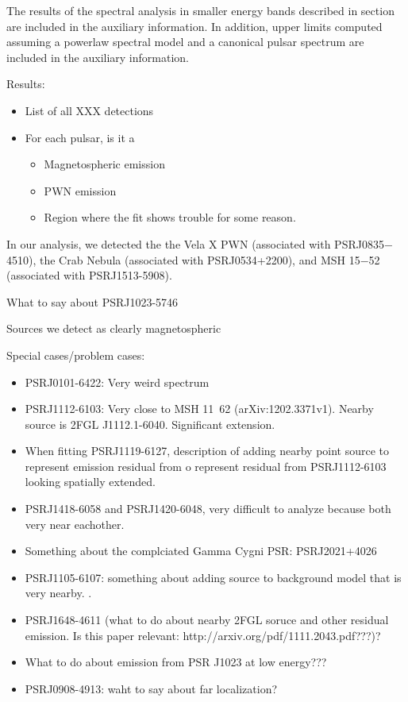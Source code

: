 The results of the spectral analysis in smaller energy bands described
in section  are included in the auxiliary
information. In addition, upper limits computed assuming a powerlaw
spectral model and a canonical pulsar spectrum are included in the
auxiliary information.



Results:
\begin{itemize}
  \item List of all XXX detections
  \item For each pulsar, is it a 
    \begin{itemize}
      \item Magnetospheric emission
      \item PWN emission
      \item Region where the fit shows trouble for some reason.
    \end{itemize}
\end{itemize}

In our analysis, we detected the the Vela X PWN (associated with PSRJ0835$-$4510), the Crab Nebula (associated
with PSRJ0534+2200), and MSH 15$-$52 (associated with PSRJ1513-5908).

What to say about PSRJ1023-5746

Sources we detect as clearly magnetospheric

Special cases/problem cases:
\begin{itemize}
  \item PSRJ0101-6422: Very weird spectrum
  \item PSRJ1112-6103: Very close to MSH 11~62 (arXiv:1202.3371v1). Nearby source is 2FGL J1112.1-6040. Significant extension.
  \item When fitting PSRJ1119-6127, description of adding nearby point
  source to represent emission residual from o represent residual from
  PSRJ1112-6103 looking spatially
    extended.
  \item PSRJ1418-6058 and PSRJ1420-6048, very difficult to analyze because both very near eachother.
  \item Something about the complciated Gamma Cygni PSR: PSRJ2021+4026
  \item PSRJ1105-6107: something about adding source to background model that is very nearby. .
  \item PSRJ1648-4611 (what to do about nearby 2FGL soruce and other residual emission. Is this paper relevant: http://arxiv.org/pdf/1111.2043.pdf???)?
  \item What to do about emission from PSR J1023 at low energy???
  \item PSRJ0908-4913: waht to say about far localization?
\end{itemize}



